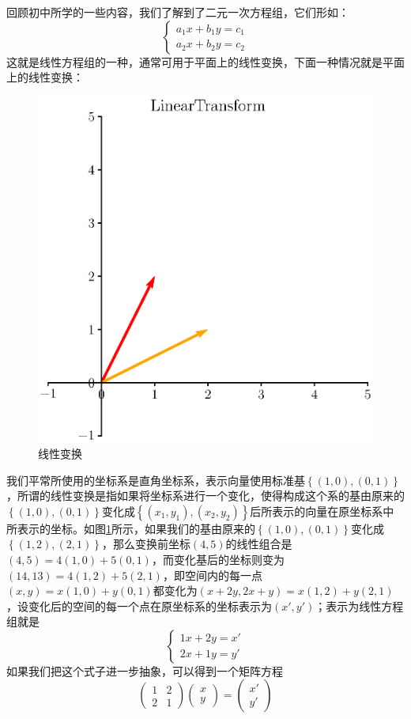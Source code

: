 回顾初中所学的一些内容，我们了解到了二元一次方程组，它们形如：
$$\left\{\begin{matrix} 
	a_1x+b_1y=c_1 \\  
	a_2x+b_2y=c_2
  \end{matrix}\right. $$
这就是线性方程组的一种，通常可用于平面上的线性变换，下面一种情况就是平面上的线性变换：

\begin{figure}[htbp]
	\centering
	\includegraphics[width=0.7\linewidth]{figure/eps/LinearTransform.eps}
	\caption{线性变换}
	\label{fig:LinearTransform}
\end{figure}

我们平常所使用的坐标系是直角坐标系，表示向量使用标准基$\left\{ (1,0),(0,1) \right\}$，所谓的线性变换是指如果将坐标系进行一个变化，使得构成这个系的基由原来的$\left\{ (1,0),(0,1) \right\}$变化成$\left\{ (x_1,y_1),(x_2,y_2) \right\}$后所表示的向量在原坐标系中所表示的坐标。如图\ref{fig:LinearTransform}所示，如果我们的基由原来的$\left\{ (1,0),(0,1) \right\}$变化成$\left\{ (1,2),(2,1) \right\}$，那么变换前坐标$(4,5)$的线性组合是$(4,5)=4(1,0)+5(0,1)$，而变化基后的坐标则变为$(14,13)=4(1,2)+5(2,1)$，即空间内的每一点$(x,y)=x(1,0)+y(0,1)$都变化为$(x+2y,2x+y)=x(1,2)+y(2,1)$，设变化后的空间的每一个点在原坐标系的坐标表示为$(x',y')$；表示为线性方程组就是$$\left\{\begin{matrix} 
	1x+2y=x' \\  
	2x+1y=y'
  \end{matrix}\right. $$如果我们把这个式子进一步抽象，可以得到一个矩阵方程\begin{equation}
	\begin{pmatrix}  
	1 & 2 \\  
	2 & 1  
  \end{pmatrix} \begin{pmatrix}  
	x \\  
	y  
  \end{pmatrix} =\begin{pmatrix}  
	x' \\  
	y'  
  \end{pmatrix}
  \label{eq:MatrixIntro}
\end{equation}

